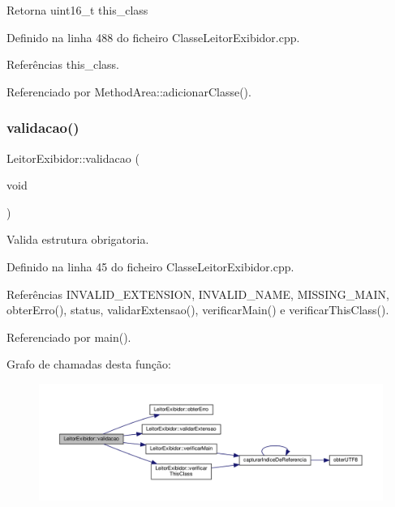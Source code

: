 \begin{DoxyReturn}{Retorna}
uint16\+\_\+t this\+\_\+class 
\end{DoxyReturn}


Definido na linha 488 do ficheiro Classe\+Leitor\+Exibidor.\+cpp.



Referências this\+\_\+class.



Referenciado por Method\+Area\+::adicionar\+Classe().

\mbox{\label{classLeitorExibidor_a422272b830079ee349b468bbe78d4b13}} 
\subsubsection{\texorpdfstring{validacao()}{validacao()}}
{\footnotesize\ttfamily Leitor\+Exibidor\+::validacao (\begin{DoxyParamCaption}\item[{void}]{ }\end{DoxyParamCaption})}



Valida estrutura obrigatoria. 



Definido na linha 45 do ficheiro Classe\+Leitor\+Exibidor.\+cpp.



Referências I\+N\+V\+A\+L\+I\+D\+\_\+\+E\+X\+T\+E\+N\+S\+I\+ON, I\+N\+V\+A\+L\+I\+D\+\_\+\+N\+A\+ME, M\+I\+S\+S\+I\+N\+G\+\_\+\+M\+A\+IN, obter\+Erro(), status, validar\+Extensao(), verificar\+Main() e verificar\+This\+Class().



Referenciado por main().

Grafo de chamadas desta função\+:
\nopagebreak
\begin{figure}[H]
\begin{center}
\leavevmode
\includegraphics[width=350pt]{classLeitorExibidor_a422272b830079ee349b468bbe78d4b13_cgraph}
\end{center}
\end{figure}
\mbox{\label{classLeitorExibidor_a83ed9ca5a7b4442ae3449daffc0d3d5c}} 
